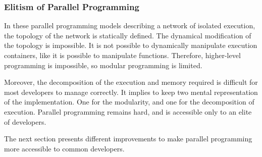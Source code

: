   






\subsubsection{Elitism of Parallel Programming}

In these parallel programming models describing a network of isolated execution, the topology of the network is statically defined. 
The dynamical modification of the topology is impossible.
It is not possible to dynamically manipulate execution containers, like it is possible to manipulate functions.
Therefore, higher-level programming is impossible, so modular programming is limited.

Moreover, the decomposition of the execution and memory required is difficult for most developers to manage correctly.
It implies to keep two mental representation of the implementation.
One for the modularity, and one for the decomposition of execution.
Parallel programming remains hard, and is accessible only to an elite of developers.

The next section presents different improvements to make parallel programming more accessible to common developers.





